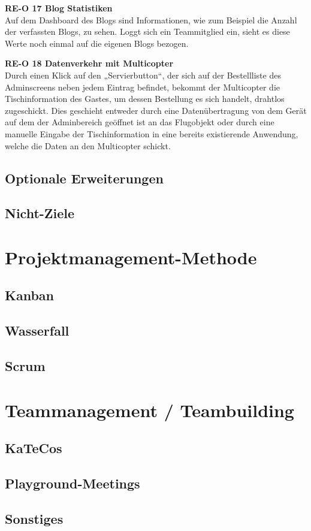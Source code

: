   \textbf{RE-O 17 Blog Statistiken}\\
  Auf dem Dashboard des Blogs sind Informationen, wie zum Beispiel die Anzahl der
  verfassten Blogs, zu sehen. Loggt sich ein Teammitglied ein, sieht es diese Werte
  noch einmal auf die eigenen Blogs bezogen.

  \textbf{RE-O 18 Datenverkehr mit Multicopter}\\
  Durch einen Klick auf den „Servierbutton“, der sich auf der Bestellliste des
  Adminscreens neben jedem Eintrag befindet, bekommt der Multicopter die Tischinformation
  des Gastes, um dessen Bestellung es sich handelt, drahtlos zugeschickt. Dies geschieht
  entweder durch eine Datenübertragung von dem Gerät auf dem der Adminbereich geöffnet
  ist an das Flugobjekt oder durch eine manuelle Eingabe der Tischinformation in eine
  bereits existierende Anwendung, welche die Daten an den Multicopter schickt.

  \subsection{Optionale Erweiterungen}

  \subsection{Nicht-Ziele}

\section{Projektmanagement-Methode}

  \subsection{Kanban}

  \subsection{Wasserfall}

  \subsection{Scrum}

\section{Teammanagement / Teambuilding}

  \subsection{KaTeCos}

  \subsection{Playground-Meetings}

  \subsection{Sonstiges}
